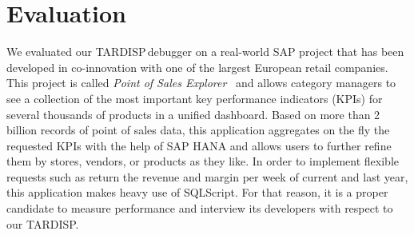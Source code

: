 \documentclass[english]{sig-alternate-05-2015}
\newcommand{\todo}[2][]{\pdfmargincomment[author={#1}]{#2}}
\newcommand{\linerefn}[2]{\hyperref[#1]{line~#2}}
\newcommand{\tool}{TARDISP}
\begin{document}
\todo{maybe show the ui}


%


\section{Evaluation}
\label{sec:evaluation}

We evaluated our \tool\,debugger on a real-world SAP project that has been developed in co-innovation with one of the largest European retail companies. 
This project is called \emph{Point of Sales Explorer}~\cite{plattner2015memory} and allows category managers to see a collection of the most important key performance indicators (KPIs) for several thousands of products in a unified dashboard.
Based on more than 2 billion records of point of sales data, this application aggregates on the fly the requested KPIs with the help of SAP HANA and allows users to further refine them by stores, vendors, or products as they like. 
In order to implement flexible requests such as return the revenue and margin per week of current and last year, this application makes heavy use of SQLScript. 
For that reason, it is a proper candidate to measure performance and interview its developers with respect to our \tool. 
\end{document}
